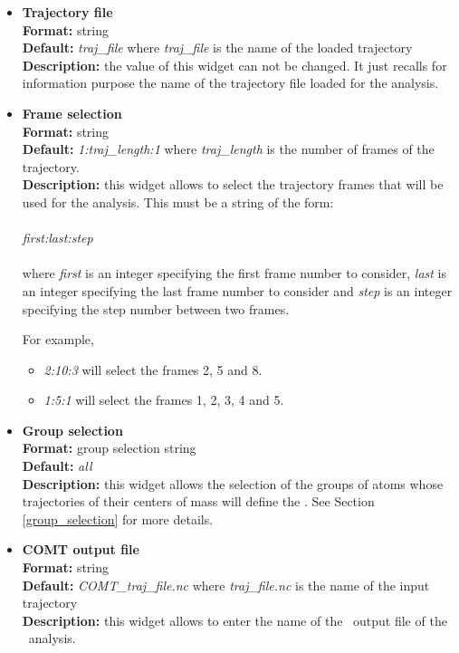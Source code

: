\documentclass[a4paper,11pt]{report}
\begin{document}
\begin{itemize}
\item \textbf{Trajectory file}\\
\textbf{Format:} string\\
\textbf{Default:} \textit{traj\_file} where \textit{traj\_file} is the name of the loaded trajectory\\
\textbf{Description:} the value of this widget can not be changed. It just recalls for information purpose the name
of the trajectory file loaded for the analysis.

\item \textbf{Frame selection}\\
\textbf{Format:} string\\
\textbf{Default:} \textit{1:traj\_length:1} where \textit{traj\_length} is the number of frames of the trajectory.\\
\textbf{Description:} this widget allows to select the trajectory frames that will be used for the analysis. This must
be a string of the form:
\\\\
\textit{first:last:step}
\\\\
where \textit{first} is an integer specifying the first frame number to consider, \textit{last} is an integer specifying the last 
frame number to consider and \textit{step} is an integer specifying the step number between two frames.

For example,
\begin{itemize}
\item \textit{2:10:3} will select the frames 2, 5 and 8.
\item \textit{1:5:1} will select the frames 1, 2, 3, 4 and 5.
\end{itemize}

\item \textbf{Group selection}\\
\textbf{Format:} group selection string\\
\textbf{Default:} \textit{all}\\
\textbf{Description:} this widget allows the selection of the groups of atoms whose trajectories of their centers of mass 
will define the \COMT . See Section \ref{group_selection} for more details.

\item \textbf{COMT output file}\\
\textbf{Format:} string\\
\textbf{Default:} \textit{COMT\_traj\_file.nc} where \textit{traj\_file.nc} is the name of the input trajectory\\
\textbf{Description:} this widget allows to enter the name of the \NetCDF\ output file of the \COMT\ analysis.
\end{itemize}
\end{document}
